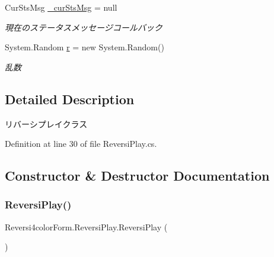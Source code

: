 \begin{DoxyCompactItemize}
\mbox{\label{class_reversi4color_form_1_1_reversi_play_a90541b85611645caedaff6994873e593}} 
Cur\+Sts\+Msg \hyperlink{class_reversi4color_form_1_1_reversi_play_a90541b85611645caedaff6994873e593}{\+\_\+cur\+Sts\+Msg} = null
\begin{DoxyCompactList}\small\item\em 現在のステータスメッセージコールバック \end{DoxyCompactList}\item 
\mbox{\label{class_reversi4color_form_1_1_reversi_play_a0b2348a5e28d78d092c3d9eab1ffcb9f}} 
System.\+Random \hyperlink{class_reversi4color_form_1_1_reversi_play_a0b2348a5e28d78d092c3d9eab1ffcb9f}{r} = new System.\+Random()
\begin{DoxyCompactList}\small\item\em 乱数 \end{DoxyCompactList}\end{DoxyCompactItemize}


\subsection{Detailed Description}
リバーシプレイクラス 

Definition at line 30 of file Reversi\+Play.\+cs.



\subsection{Constructor \& Destructor Documentation}
\mbox{\label{class_reversi4color_form_1_1_reversi_play_a9cf1450361c14688ace1dec2214e57c4}} 
\subsubsection{\texorpdfstring{Reversi\+Play()}{ReversiPlay()}}
{\footnotesize\ttfamily Reversi4color\+Form.\+Reversi\+Play.\+Reversi\+Play (\begin{DoxyParamCaption}{ }\end{DoxyParamCaption})}



